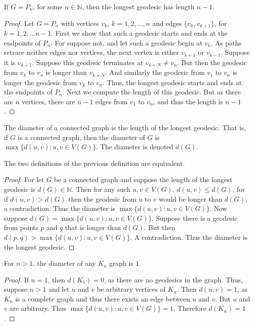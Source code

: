     \begin{theorem}
    If $G = P_n$, for some $n\in \mathbb{N}$, then the longest geodesic has length $n-1$.
    \end{theorem}
    \begin{proof}
    Let $G=P_n$ with vertices $v_k$, $k=1,2,\hdots, n$ and edges $\{v_k,v_{k+1}\}$, for $k=1,2,\hdots n-1$. First we show that such a geodesic starts and ends at the endpoints of $P_n$. For suppose not, and let such a geodesic begin at $v_k$. As paths retrace neither edges nor vertices, the next vertex is either $v_{k+1}$ or $v_{k-1}$. Suppose it is $v_{k+1}$. Suppose this geodesic terminates at $v_{k+N} \ne v_{n}$. But then the geodesic from $v_{k}$ to $v_{n}$ is longer than $v_{k+N}$. And similarly the geodesic from $v_1$ to $v_n$ is longer the geodesic from $v_k$ to $v_n$. Thus, the longest geodesic starts and ends at the endpoints of $P_n$. Next we compute the length of this geodesic. But as there are $n$ vertices, there are $n-1$ edges from $v_1$ to $v_n$, and thus the length is $n-1$.
    \end{proof}
    \begin{definition}
    The diameter of a connected graph is the length of the longest geodesic. That is, if $G$ is a connected graph, then the diameter of $G$ is $\max\{d(u,v): u,v\in V(G)\}$. The diameter is denoted $d(G)$.
    \end{definition}
    \begin{theorem}
    The two definitions of the previous definition are equivalent.
    \end{theorem}
    \begin{proof}
    For let $G$ be a connected graph and suppose the length of the longest geodesic is $d(G)\in \mathbb{N}$. Then for any such $u,v\in V(G)$, $d(u,v) \leq d(G)$, for if $d(u,v)> d(G)$ then the geodesic from $u$ to $v$ would be longer than $d(G)$, a contradiction. Thus the diameter is $\max\{d(u,v):u,v\in V(G)\}$. Now suppose $d(G) = \max\{d(u,v):u,v \in V(G)\}$. Suppose there is a geodesic from points $p$ and $q$ that is longer than $d(G)$. But then $d(p,q)>\max\{d(u,v):u,v\in V(G)\}$. A contradiction. Thus the diameter is the longest geodesic.
    \end{proof}
    \begin{theorem}
    For $n>1$, the diameter of any $K_n$ graph is $1$.
    \end{theorem}
    \begin{proof}
    If $n=1$, then $d(K_1) = 0$, as there are no geodesics in the graph. Thus, suppose $n>1$ and let $u$ and $v$ be arbitrary vertices of $K_n$. Then $d(u,v)=1$, as $K_n$ is a complete graph and thus there exists an edge between $u$ and $v$. But $u$ and $v$ are arbitrary. Thus $\max\{d(u,v):u,v\in V(G)\} = 1$. Therefore $d(K_n) = 1$.
    \end{proof}
